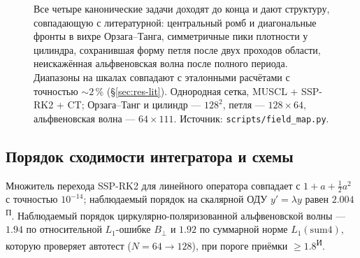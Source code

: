 \documentclass[12pt,a4paper]{article}
\newcommand{\B}{\mathbf{B}}
\newcommand{\code}[1]{\texttt{#1}}
\newcommand{\Pv}{\textsuperscript{\scriptsize П}}   %
\newcommand{\Iz}{\textsuperscript{\scriptsize И}}    %
\begin{document}
\begin{figure}[htbp]
\medskip
\begin{minipage}{0.49\textwidth}\centering
{}
\end{minipage}\hfill
\begin{minipage}{0.49\textwidth}\centering
{}
\end{minipage}
\caption{Все четыре канонические задачи доходят до конца и дают структуру,
совпадающую с литературной: центральный ромб и диагональные фронты в вихре
Орзага--Танга, симметричные пики плотности у цилиндра, сохранившая форму петля
после двух проходов области, неискажённая альфвеновская волна после полного
периода. Диапазоны на шкалах совпадают с эталонными расчётами с точностью
$\sim2\,\%$ (\S\ref{sec:res-lit}). Однородная сетка, MUSCL + SSP-RK2 + CT;
Орзага--Танг и цилиндр --- $128^2$, петля --- $128\times64$, альфвеновская
волна --- $64\times111$. Источник: \code{scripts/field\_map.py}.}
\label{fig:maps}
\end{figure}


\subsection{Порядок сходимости интегратора и схемы}
\label{sec:res-conv}

Множитель перехода SSP-RK2 для линейного оператора совпадает с
$1+a+\tfrac12a^2$ с точностью $10^{-14}$; наблюдаемый порядок на скалярной ОДУ
$y'=\lambda y$ равен $2.004$\Pv. Наблюдаемый порядок циркулярно-поляризованной
альфвеновской волны --- $1.94$ по относительной $L_1$-ошибке $B_\perp$ и
$1.92$ по суммарной норме $L_1(\text{sum4})$, которую проверяет автотест
($N{=}64\to128$), при пороге приёмки $\geq1.8$\Iz.
\end{document}
